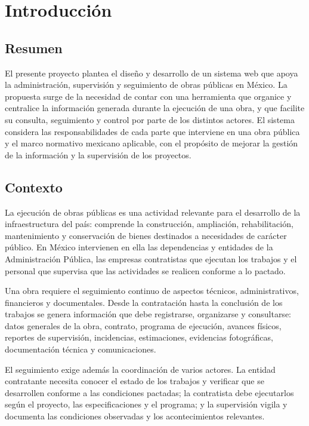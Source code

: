 \chapter{Introducción}

\section*{Resumen}
El presente proyecto plantea el diseño y desarrollo de un sistema web que apoya la administración, supervisión y seguimiento de obras públicas en México. La propuesta surge de la necesidad de contar con una herramienta que organice y centralice la información generada durante la ejecución de una obra, y que facilite su consulta, seguimiento y control por parte de los distintos actores. El sistema considera las responsabilidades de cada parte que interviene en una obra pública y el marco normativo mexicano aplicable, con el propósito de mejorar la gestión de la información y la supervisión de los proyectos.

\section{Contexto}
La ejecución de obras públicas es una actividad relevante para el desarrollo de la infraestructura del país: comprende la construcción, ampliación, rehabilitación, mantenimiento y conservación de bienes destinados a necesidades de carácter público. En México intervienen en ella las dependencias y entidades de la Administración Pública, las empresas contratistas que ejecutan los trabajos y el personal que supervisa que las actividades se realicen conforme a lo pactado.

Una obra requiere el seguimiento continuo de aspectos técnicos, administrativos, financieros y documentales. Desde la contratación hasta la conclusión de los trabajos se genera información que debe registrarse, organizarse y consultarse: datos generales de la obra, contrato, programa de ejecución, avances físicos, reportes de supervisión, incidencias, estimaciones, evidencias fotográficas, documentación técnica y comunicaciones.

El seguimiento exige además la coordinación de varios actores. La entidad contratante necesita conocer el estado de los trabajos y verificar que se desarrollen conforme a las condiciones pactadas; la contratista debe ejecutarlos según el proyecto, las especificaciones y el programa; y la supervisión vigila y documenta las condiciones observadas y los acontecimientos relevantes.

